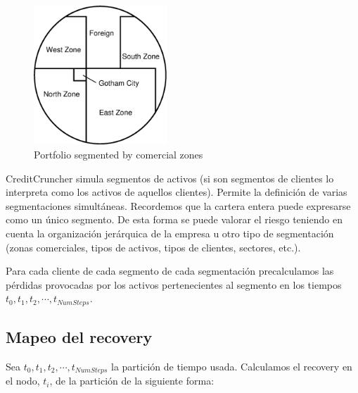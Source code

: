\begin{figure}[!hb]
\begin{center}
\includegraphics[width=5cm,angle=0]{./images/segments.eps}
\caption{Portfolio segmented by comercial zones}
\label{fig:segments}
\end{center}
\end{figure}

CreditCruncher simula segmentos de activos (si son segmentos de clientes lo
interpreta como los activos de aquellos clientes). Permite la definici\'on
de varias segmentaciones simult\'aneas. Recordemos que la cartera entera
puede expresarse como un \'unico segmento. De esta forma se puede valorar
el riesgo teniendo en cuenta la organizaci\'on jer\'arquica de la empresa
u otro tipo de segmentaci\'on (zonas comerciales, tipos de activos, tipos de
clientes, sectores, etc.).
\newline

Para cada cliente de cada segmento de cada segmentaci\'on precalculamos las
p\'erdidas provocadas por los activos pertenecientes al segmento en los
tiempos $t_0, t_1, t_2, \cdots, t_{NumSteps}$.


\subsection{Mapeo del recovery}

Sea $t_0, t_1, t_2, \cdots, t_{NumSteps}$ la partici\'on de tiempo usada.
Calculamos el recovery en el nodo, $t_i$, de la partici\'on de la
siguiente forma:

